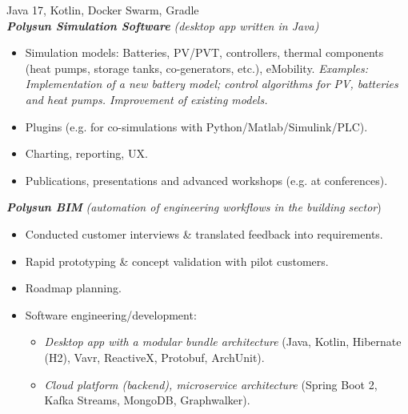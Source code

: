 \documentclass[11pt,a4paper,ngerman,sans]{moderncv}
\begin{document}
{
  \begin{adjustwidth}{\maincolumnindent}{\rightskip}
    \small{
      Java 17, Kotlin, Docker Swarm, Gradle\newline
      \\
      \textbf{\emph{Polysun Simulation Software}} \emph{(desktop app written in Java)}
      \begin{itemize}
        \item Simulation models: Batteries, PV/PVT, controllers, thermal components\newline
          (heat pumps, storage tanks, co-generators, etc.), eMobility.\newline
          \emph{
           Examples: Implementation of a new battery model;\newline
           control algorithms for PV, batteries and heat pumps.\newline
           Improvement of existing models.
          }
        \item Plugins (e.g. for co-simulations with Python/Matlab/Simulink/PLC).
        \item Charting, reporting, UX.
        \item Publications, presentations and advanced workshops (e.g. at conferences).
          \\
      \end{itemize}
      \textbf{\emph{Polysun BIM}} 
      \emph{(automation of engineering workflows in the building sector})
      \begin{itemize}
        \item Conducted customer interviews \& translated feedback into requirements.
        \item Rapid prototyping \& concept validation with pilot customers.
        \item Roadmap planning.
        \item Software engineering/development:
          \begin{itemize}
            \item \emph{Desktop app with a modular bundle architecture}\newline
              (Java, Kotlin, Hibernate (H2), Vavr, ReactiveX, Protobuf, ArchUnit).
            \item \emph{Cloud platform (backend), microservice architecture}\newline
              (Spring Boot 2, Kafka Streams, MongoDB, Graphwalker).

\end{itemize}
\end{itemize}}
\end{adjustwidth}}
\end{document}

